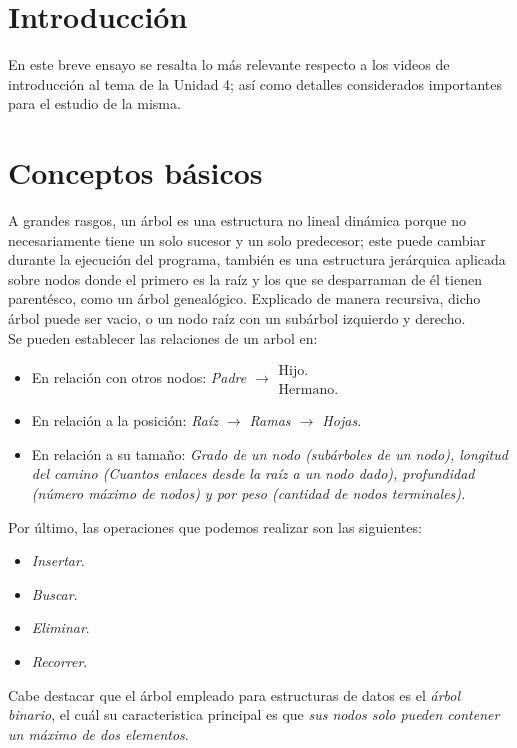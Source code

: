 \documentclass[letterpaper, 12pt]{article}
\begin{document}
        \newpage
        \begin{justify}
            \setcounter{page}{1}
            \thispagestyle{fancy}
            \section{Introducción}
            En este breve ensayo se resalta lo más relevante respecto a los videos de introducción al tema de la Unidad 4; así como detalles considerados importantes para el estudio de la misma. 
            \section{Conceptos básicos}
            A grandes rasgos, un árbol es una estructura no lineal dinámica porque no necesariamente tiene un solo sucesor y un solo predecesor; este puede cambiar durante la ejecución del programa, también es una estructura jerárquica aplicada sobre nodos donde el primero es
            la raíz y los que se desparraman de él tienen parentésco, como un árbol genealógico. Explicado de manera recursiva, dicho árbol puede ser vacio, o un nodo raíz con un subárbol izquierdo y derecho.
            \\\newline Se pueden establecer las relaciones de un arbol en:
            \begin{itemize}
                \item En relación con otros nodos: \emph{Padre \(\rightarrow \begin{matrix}
                    \text{Hijo.}\\
                    \text{Hermano.}
                \end{matrix}\)}
                \item En relación a la posición: \emph{Raíz \(\rightarrow\) Ramas \(\rightarrow\) Hojas.}
                \item En relación a su tamaño: \emph{Grado de un nodo (subárboles de un nodo), longitud del camino (Cuantos enlaces desde la raíz a un nodo dado), profundidad (número máximo de nodos) y por peso (cantidad de nodos terminales).}
            \end{itemize}
            Por último, las operaciones que podemos realizar son las siguientes:
            \begin{itemize}
                \item \emph{Insertar}.
                \item \emph{Buscar}.
                \item \emph{Eliminar}.
                \item \emph{Recorrer}.
            \end{itemize}
            Cabe destacar que el árbol empleado para estructuras de datos es el \emph{árbol binario}, el cuál su caracteristica principal es que \emph{sus nodos solo pueden contener un máximo de dos elementos}. 

\end{justify}
\end{document}
